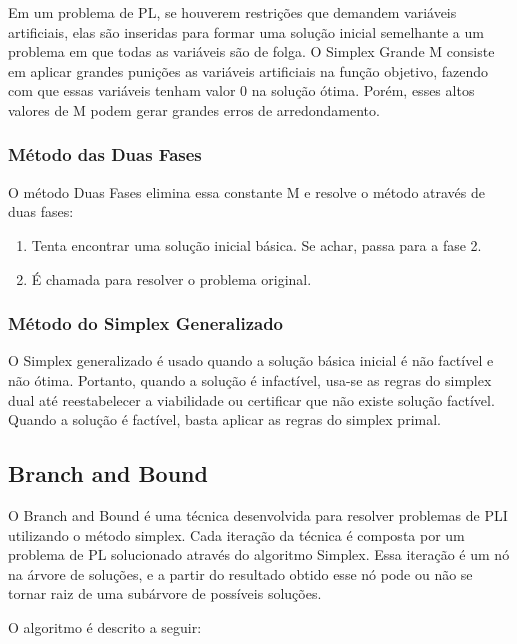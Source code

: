\documentclass [11pt]{articleSBPO}
\begin{document}
Em um problema de PL, se houverem restrições que demandem variáveis artificiais, elas são inseridas para formar uma solução inicial semelhante a um problema em que todas as variáveis são de folga. O Simplex Grande M consiste em aplicar grandes punições as variáveis artificiais na função objetivo, fazendo com que essas variáveis tenham valor 0 na solução ótima.
Porém, esses altos valores de M podem gerar grandes erros de arredondamento. 

\subsubsection{Método das Duas Fases}\label{subsubsec:duasfases}

O método Duas Fases elimina essa constante M e resolve o método através de duas fases:

\begin{enumerate}
	\item Tenta encontrar uma solução inicial básica. Se achar, passa para a fase 2.
	\item É chamada para resolver o problema original.
\end{enumerate}

\subsubsection{Método do Simplex Generalizado}\label{subsubsec:generalizado}

O Simplex generalizado é usado quando a solução básica inicial é não factível e não ótima. Portanto, quando a solução é infactível, usa-se as regras do simplex dual até reestabelecer a viabilidade ou certificar que não existe solução factível. Quando a solução é factível, basta aplicar as regras do simplex primal.

\subsection{Branch and Bound}\label{subsec:bnb}

O Branch and Bound é uma técnica desenvolvida para resolver problemas de PLI utilizando o método simplex. Cada iteração da técnica é composta por um problema de PL solucionado através do algoritmo Simplex. Essa iteração é um nó na árvore de soluções, e a partir do resultado obtido esse nó pode ou não se tornar raiz de uma subárvore de possíveis soluções.

O algoritmo é descrito a seguir:
\end{document}
